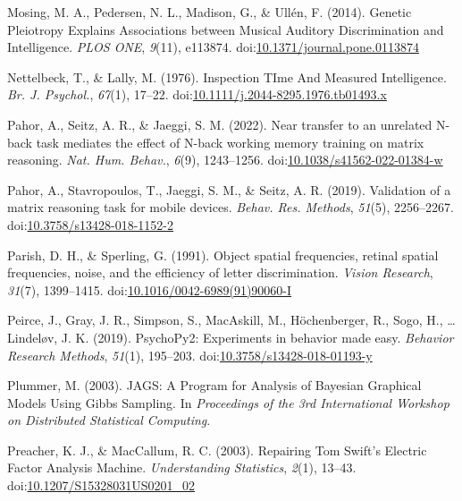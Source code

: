 \documentclass[
  ,man]{apa6}
\newlength{\cslhangindent}
\newenvironment{CSLReferences}[2] %
 {\begin{list}{}{%
  \setlength{\itemindent}{0pt}
  \setlength{\leftmargin}{0pt}
  \setlength{\parsep}{0pt}
  \ifodd #1
   \setlength{\leftmargin}{\cslhangindent}
   \setlength{\itemindent}{-1\cslhangindent}
  \fi
  \setlength{\itemsep}{#2\baselineskip}}}
 {\end{list}}
\begin{document}
\begin{CSLReferences}{1}{0}
Mosing, M. A., Pedersen, N. L., Madison, G., \& Ullén, F. (2014). Genetic {Pleiotropy Explains Associations} between {Musical Auditory Discrimination} and {Intelligence}. \emph{PLOS ONE}, \emph{9}(11), e113874. doi:\href{https://doi.org/10.1371/journal.pone.0113874}{10.1371/journal.pone.0113874}

Nettelbeck, T., \& Lally, M. (1976). {Inspection TIme And Measured Intelligence}. \emph{Br. J. Psychol.}, \emph{67}(1), 17--22. doi:\href{https://doi.org/10.1111/j.2044-8295.1976.tb01493.x}{10.1111/j.2044-8295.1976.tb01493.x}

Pahor, A., Seitz, A. R., \& Jaeggi, S. M. (2022). Near transfer to an unrelated {N}-back task mediates the effect of {N}-back working memory training on matrix reasoning. \emph{Nat. Hum. Behav.}, \emph{6}(9), 1243--1256. doi:\href{https://doi.org/10.1038/s41562-022-01384-w}{10.1038/s41562-022-01384-w}

Pahor, A., Stavropoulos, T., Jaeggi, S. M., \& Seitz, A. R. (2019). Validation of a matrix reasoning task for mobile devices. \emph{Behav. Res. Methods}, \emph{51}(5), 2256--2267. doi:\href{https://doi.org/10.3758/s13428-018-1152-2}{10.3758/s13428-018-1152-2}

Parish, D. H., \& Sperling, G. (1991). Object spatial frequencies, retinal spatial frequencies, noise, and the efficiency of letter discrimination. \emph{Vision Research}, \emph{31}(7), 1399--1415. doi:\href{https://doi.org/10.1016/0042-6989(91)90060-I}{10.1016/0042-6989(91)90060-I}

Peirce, J., Gray, J. R., Simpson, S., MacAskill, M., Höchenberger, R., Sogo, H., \ldots{} Lindeløv, J. K. (2019). {PsychoPy2}: {Experiments} in behavior made easy. \emph{Behavior Research Methods}, \emph{51}(1), 195--203. doi:\href{https://doi.org/10.3758/s13428-018-01193-y}{10.3758/s13428-018-01193-y}

Plummer, M. (2003). {JAGS}: {A Program} for {Analysis} of {Bayesian Graphical Models Using Gibbs Sampling}. In \emph{Proceedings of the 3rd {International Workshop} on {Distributed Statistical Computing}}.

Preacher, K. J., \& MacCallum, R. C. (2003). Repairing {Tom Swift}'s {Electric Factor Analysis Machine}. \emph{Understanding Statistics}, \emph{2}(1), 13--43. doi:\href{https://doi.org/10.1207/S15328031US0201_02}{10.1207/S15328031US0201\_02}


\end{CSLReferences}
\end{document}
